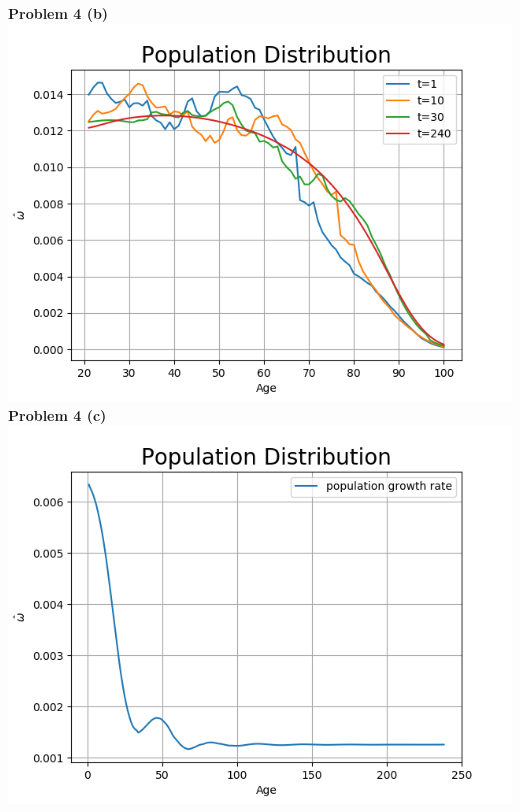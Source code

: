 \documentclass[letterpaper,12pt]{article}
\theoremstyle{definition}
\begin{document}
\noindent\textbf{Problem 4 (b)}\\
\includegraphics[scale=0.5]{images_dem/population_dist_times.png}
\\

\noindent\textbf{Problem 4 (c)}\\
\includegraphics[scale=0.5]{images_dem/population_growth.png}
\\
\end{document}
